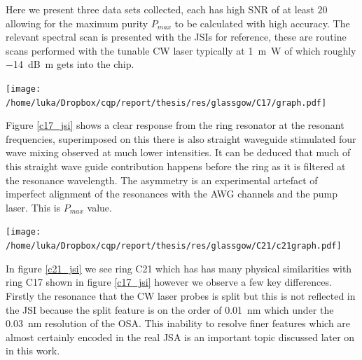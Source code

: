Here we present three data sets collected, each has high SNR of at least $20$ allowing for the maximum purity $P_{max}$ to be calculated with high accuracy. The relevant spectral scan is presented with the JSIs for reference, these are routine scans performed with the tunable CW laser typically at \SI{1}{\m\watt} of which roughly \SI{-14}{\deci\bel\m} gets into the chip. 

\begingroup
    \centering  
    \texttt{[image: /home/luka/Dropbox/cqp/report/thesis/res/glassgow/C17/graph.pdf]}
     \vspace{3pt} \label{c17_jsi}
\endgroup



Figure \ref{c17_jsi} shows a clear response from the ring resonator at the resonant frequencies, superimposed on this there is also straight waveguide stimulated four wave mixing observed at much lower intensities. It can be deduced that much of this straight wave guide contribution happens before the ring as it is filtered at the resonance wavelength.
The asymmetry is an experimental artefact of imperfect alignment of the resonances with the AWG channels and the pump laser. This is  $P_{max}$ value.

\begingroup
    \centering  
    \texttt{[image: /home/luka/Dropbox/cqp/report/thesis/res/glassgow/C21/c21graph.pdf]}
     \vspace{3pt} \label{c21_jsi}
\endgroup

In figure \ref{c21_jsi} we see ring C21 which has has many physical similarities with ring C17 shown in figure \ref{c17_jsi} however we observe a few key differences. Firstly the resonance that the CW laser probes is split but this is not reflected in the JSI because the split feature is on the order of \SI{0.01}{\nano\meter} which under the \SI{0.03}{\nano\meter} resolution of the OSA. This inability to resolve finer features which are almost certainly encoded in the real JSA is an important topic discussed later on in this work.

